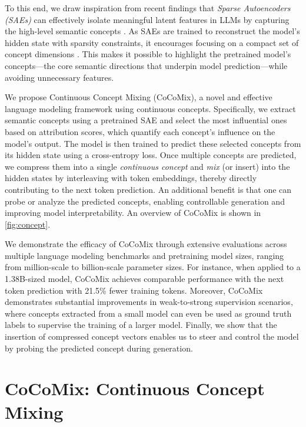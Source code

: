 \documentclass[]{fairmeta}
\newcommand{\lname}{Continuous Concept Mixing\xspace}
\newcommand{\mnamefirst}{Continuous Concept Mixing (CoCoMix)\xspace}
\newcommand{\sname}{CoCoMix\xspace}
\begin{document}
To this end, we draw inspiration from recent findings that \emph{Sparse Autoencoders (SAEs)} can effectively isolate meaningful latent features in LLMs by capturing the high-level semantic concepts \citep{cunningham2023sparse, bricken2023monosemanticity}. As SAEs are trained to reconstruct the model's hidden state with sparsity constraints, it encourages focusing on a compact set of concept dimensions \citep{templeton2024scaling}. This makes it possible to highlight the pretrained model’s concepts---the core semantic directions that underpin model prediction---while avoiding unnecessary features. 



We propose \mnamefirst, a novel and effective language modeling framework using continuous concepts. Specifically, we extract semantic concepts using a pretrained SAE and select the most influential ones based on attribution scores, which quantify each concept’s influence on the model’s output. The model is then trained to predict these selected concepts from its hidden state using a cross-entropy loss. Once multiple concepts are predicted, we compress them into a single \emph{continuous concept} and \emph{mix} (or insert) into the hidden states by interleaving with token embeddings, thereby directly contributing to the next token prediction. An additional benefit is that one can probe or analyze the predicted concepts, enabling controllable generation and improving model interpretability. An overview of \sname is shown in \autoref{fig:concept}.

We demonstrate the efficacy of \sname through extensive evaluations across multiple language modeling benchmarks and pretraining model sizes, ranging from million-scale to billion-scale parameter sizes. For instance, when applied to a 1.38B-sized model, \sname achieves comparable performance with the next token prediction with 21.5\% fewer training tokens. Moreover, \sname demonstrates substantial improvements in weak-to-strong supervision scenarios, where concepts extracted from a small model can even be used as ground truth labels to supervise the training of a larger model. Finally, we show that the insertion of compressed concept vectors enables us to steer and control the model by probing the predicted concept during generation. 



\section{\sname: \lname}
\label{sec:method}
\end{document}
